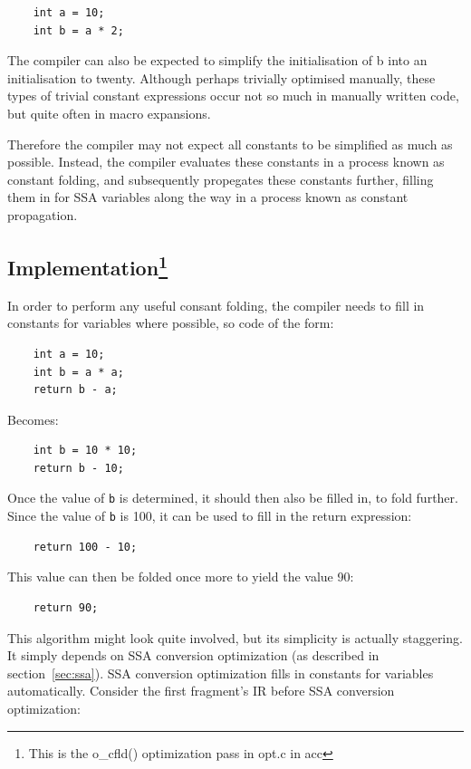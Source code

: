 \documentclass[12pt, a4paper]{article}
\begin{document}
\begin{lstlisting}
	int a = 10;
	int b = a * 2;
\end{lstlisting}

The compiler can also be expected to simplify the initialisation of b into an 
initialisation to twenty. Although perhaps trivially optimised manually, these
types of trivial constant expressions occur not so much in manually written code,
but quite often in macro expansions.

Therefore the compiler may not expect all constants to be simplified as much as
possible. Instead, the compiler evaluates these constants in a process known as 
constant folding, and subsequently propegates these constants further, filling 
them in for SSA variables along the way in a process known as constant 
propagation.

\subsection[Implementation] {Implementation\footnote{This is the o\_cfld() optimization pass in opt.c in acc} }
In order to perform any useful consant folding, the compiler needs to fill in 
constants for variables where possible, so code of the form:

\begin{lstlisting}
	int a = 10;
	int b = a * a;
	return b - a;
\end{lstlisting}

Becomes:

\begin{lstlisting}
	int b = 10 * 10;
	return b - 10;
\end{lstlisting}

Once the value of \verb+b+ is determined, it should then also be filled in, to fold 
further. Since the value of \verb+b+ is 100, it can be used to fill in the return 
expression:

\begin{lstlisting}
	return 100 - 10;
\end{lstlisting}

This value can then be folded once more to yield the value 90:

\begin{lstlisting}
	return 90;
\end{lstlisting}

This algorithm might look quite involved, but its simplicity is actually 
staggering. It simply depends on SSA conversion optimization (as described in
section~\ref{sec:ssa}). SSA conversion 
optimization fills in constants for variables automatically. Consider the first 
fragment's IR before SSA conversion optimization:
\end{document}
